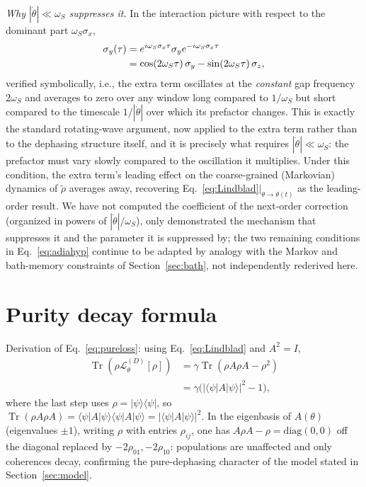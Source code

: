 \documentclass[aps,pra,reprint,superscriptaddress,nofootinbib,longbibliography]{revtex4-2}
\newcommand{\tr}{\operatorname{Tr}}
\begin{document}
\emph{Why $|\dot\theta|\ll\omega_S$ suppresses it.} In the interaction
picture with respect to the dominant part $\omega_S\sigma_x$,
\begin{align}
\sigma_y(\tau) &= e^{i\omega_S\sigma_x\tau}\sigma_y e^{-i\omega_S\sigma_x\tau}\notag\\
&= \cos(2\omega_S\tau)\,\sigma_y - \sin(2\omega_S\tau)\,\sigma_z,
\end{align}
verified symbolically, i.e., the extra term oscillates at the
\emph{constant} gap frequency $2\omega_S$ and averages to zero over
any window long compared to $1/\omega_S$ but short compared to the
timescale $1/|\dot\theta|$ over which its prefactor changes. This is
exactly the standard rotating-wave argument, now applied to the extra
term rather than to the dephasing structure itself, and it is precisely
what requires $|\dot\theta|\ll\omega_S$: the prefactor must vary slowly
compared to the oscillation it multiplies. Under this condition, the
extra term's leading effect on the coarse-grained (Markovian) dynamics
of $\tilde\rho$ averages away, recovering
Eq.~\eqref{eq:Lindblad}$|_{\theta\to\theta(t)}$ as the leading-order
result. We have not computed the coefficient of the next-order
correction (organized in powers of $|\dot\theta|/\omega_S$), only
demonstrated the mechanism that suppresses it and the parameter it is
suppressed by; the two remaining conditions in
Eq.~\eqref{eq:adiahyp} continue to be adapted by analogy with the
Markov and bath-memory constraints of Section~\ref{sec:bath}, not
independently rederived here.

\section{Purity decay formula}
\label{app:purity}

Derivation of Eq.~\eqref{eq:pureloss}: using
Eq.~\eqref{eq:Lindblad} and $A^2=I$,
\begin{align}
\tr(\rho\mathcal{L}^{(D)}_\theta[\rho])
&= \gamma\tr(\rho A\rho A - \rho^2) \nonumber\\
&= \gamma\bigl(|\langle\psi|A|\psi\rangle|^2 - 1\bigr),
\end{align}
where the last step uses $\rho=|\psi\rangle\langle\psi|$, so
$\tr(\rho A\rho A)=\langle\psi|A|\psi\rangle\langle\psi|A|\psi\rangle
=|\langle\psi|A|\psi\rangle|^2$. In the eigenbasis of $A(\theta)$
(eigenvalues $\pm1$), writing $\rho$ with entries $\rho_{ij}$, one has
$A\rho A-\rho=\mathrm{diag}(0,0)$ off the diagonal replaced by
$-2\rho_{01},-2\rho_{10}$: populations are unaffected and only
coherences decay, confirming the pure-dephasing character of the
model stated in Section~\ref{sec:model}.
\end{document}
